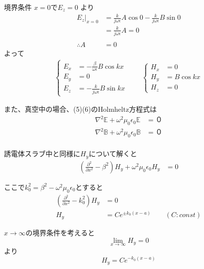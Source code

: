 \documentclass[a4paper,10pt]{bxjsarticle}
\begin{document}
境界条件 $x = 0$で$E_z = 0$ より
\begin{align*}
    E_z|_{x=0} 
        &= \frac{k}{j \omega \epsilon} A \cos 0 - \frac{k}{j \omega \epsilon} B \sin 0 \\
        &= \frac{k}{j \omega \epsilon} A = 0 \\
        \\
    \therefore A &= 0
\end{align*}
よって
\begin{align*}
    \begin{cases}
        E_x &= -\frac{\beta}{\omega \epsilon} B \cos k x \\
        E_y &= 0 \\
        E_z &= - \frac{k}{j \omega \epsilon} B \sin kx
    \end{cases} \qquad
    \begin{cases}
        H_x &= 0 \\
        H_y &= B \cos k x \\
        H_z &= 0
    \end{cases}
\end{align*}

また、真空中の場合、(5)(6)のHolmheltz方程式は
\begin{align*}
    \nabla^2 \mathbb{E} + \omega^2 \mu_0 \epsilon_0 \mathbb{E} &= ０ \\
    \nabla^2 \mathbb{B} + \omega^2 \mu_0 \epsilon_0 \mathbb{B} &= ０ \\
\end{align*}

誘電体スラブ中と同様に$H_y$について解くと
\begin{align*}
    ( \frac{\partial^2}{\partial x^2} - \beta^2)H_y + \omega^2 \mu_0 \epsilon_0 H_y &= 0
\end{align*}

ここで$k_0^2 = \beta^2 - \omega^2 \mu_0 \epsilon_0$とすると
\begin{align*}
    ( \frac{\partial^2}{\partial x^2} - k_0^2)H_y &= 0 \\
    H_y &= C e^{\pm k_0 (x - a)} \qquad ( C : const)
\end{align*}

$x \rightarrow \infty$の境界条件を考えると
$$ \lim_{x \to \infty} H_y = 0 $$ より
$$ H_y = C e^{- k_0 (x - a)} $$
\end{document}
